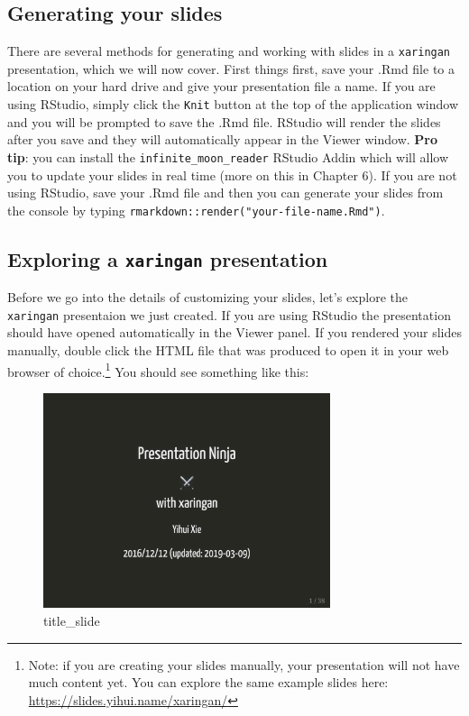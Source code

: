\documentclass[
]{book}
\begin{document}
\hypertarget{generating-your-slides}{%
\subsection{Generating your slides}\label{generating-your-slides}}

There are several methods for generating and working with slides in a \texttt{xaringan} presentation, which we will now cover. First things first, save your .Rmd file to a location on your hard drive and give your presentation file a name. If you are using RStudio, simply click the \texttt{Knit} button at the top of the application window and you will be prompted to save the .Rmd file. RStudio will render the slides after you save and they will automatically appear in the Viewer window. \textbf{Pro tip}: you can install the \texttt{infinite\_moon\_reader} RStudio Addin which will allow you to update your slides in real time (more on this in Chapter 6). If you are not using RStudio, save your .Rmd file and then you can generate your slides from the console by typing \texttt{rmarkdown::render("your-file-name.Rmd")}.

\hypertarget{exploring-a-xaringan-presentation}{%
\subsection{\texorpdfstring{Exploring a \texttt{xaringan} presentation}{Exploring a xaringan presentation}}\label{exploring-a-xaringan-presentation}}

Before we go into the details of customizing your slides, let's explore the \texttt{xaringan} presentaion we just created. If you are using RStudio the presentation should have opened automatically in the Viewer panel. If you rendered your slides manually, double click the HTML file that was produced to open it in your web browser of choice.\footnote{Note: if you are creating your slides manually, your presentation will not have much content yet. You can explore the same example slides here: \url{https://slides.yihui.name/xaringan/}} You should see something like this:

\begin{figure}
\centering
\includegraphics[width=0.75\textwidth,height=\textheight]{img/02_title-slide.png}
\caption{title\_slide}
\end{figure}
\end{document}
